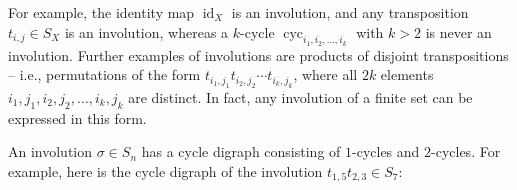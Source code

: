 For example, the identity map $\operatorname*{id}\nolimits_{X}$ is an
involution, and any transposition $t_{i,j}\in S_{X}$ is an involution, whereas
a $k$-cycle $\operatorname*{cyc}\nolimits_{i_{1},i_{2},\ldots,i_{k}}$ with
$k>2$ is never an involution. Further examples of involutions are products of
disjoint transpositions -- i.e., permutations of the form $t_{i_{1},j_{1}%
}t_{i_{2},j_{2}}\cdots t_{i_{k},j_{k}}$, where all $2k$ elements $i_{1}%
,j_{1},i_{2},j_{2},\ldots,i_{k},j_{k}$ are distinct. In fact, any involution
of a finite set can be expressed in this form.

An involution $\sigma\in S_{n}$ has a cycle digraph consisting of $1$-cycles
and $2$-cycles. For example, here is the cycle digraph of the involution
$t_{1,5}t_{2,3}\in S_{7}$:%
\[%
\]


